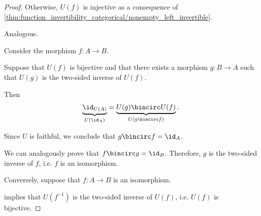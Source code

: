 \begin{proof}
  Otherwise, \( U(f) \) is injective as a consequence of \cref{thm:function_invertibility_categorical/nonempty_left_invertible}.

   Analogous.

   Consider the morphism \( f: A \to B \).

  \SufficiencySubProof* Suppose that \( U(f) \) is bijective and that there exists a morphism \( g: B \to A \) such that \( U(g) \) is the two-sided inverse of \( U(f) \).

  Then
  \begin{equation*}
    \underbrace{\id_{U(A)}}_{U(\id_A)} = \underbrace{U(g) \bincirc U(f)}_{U(g \bincirc f)}.
  \end{equation*}

  Since \( U \) is faithful, we conclude that \( g \bincirc f = \id_A \).

  We can analogously prove that \( f \bincirc g = \id_B \). Therefore, \( g \) is the two-sided inverse of \( f \), i.e. \( f \) is an isomorphism.

  \NecessitySubProof* Conversely, suppose that \( f: A \to B \) is an isomorphism.

   implies that \( U(f^{-1}) \) is the two-sided inverse of \( U(f) \), i.e. \( U(f) \) is bijective.
\end{proof}

